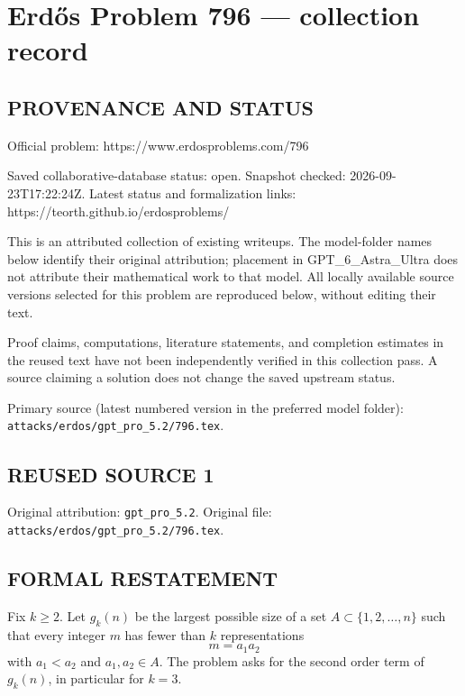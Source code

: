 \section*{Erd\H{o}s Problem 796 --- collection record}

\subsection*{PROVENANCE AND STATUS}
Official problem: https://www.erdosproblems.com/796

Saved collaborative-database status: open.
Snapshot checked: 2026-09-23T17:22:24Z.
Latest status and formalization links: https://teorth.github.io/erdosproblems/

This is an attributed collection of existing writeups. The model-folder names below identify their original attribution; placement in GPT\_6\_Astra\_Ultra does not attribute their mathematical work to that model. All locally available source versions selected for this problem are reproduced below, without editing their text.

Proof claims, computations, literature statements, and completion estimates in the reused text have not been independently verified in this collection pass. A source claiming a solution does not change the saved upstream status.

Primary source (latest numbered version in the preferred model folder): \texttt{attacks/erdos/gpt\_pro\_5.2/796.tex}.

\subsection*{REUSED SOURCE 1}
Original attribution: \texttt{gpt\_pro\_5.2}.
Original file: \texttt{attacks/erdos/gpt\_pro\_5.2/796.tex}.


\subsection*{FORMAL RESTATEMENT}
Fix $k\ge 2$. Let $g_k(n)$ be the largest possible size of a set $A\subset\{1,2,\dots,n\}$ such that every integer $m$ has fewer than $k$ representations
\[
 m=a_1a_2
\]
with $a_1<a_2$ and $a_1,a_2\in A$.
The problem asks for the second order term of $g_k(n)$, in particular for $k=3$.

